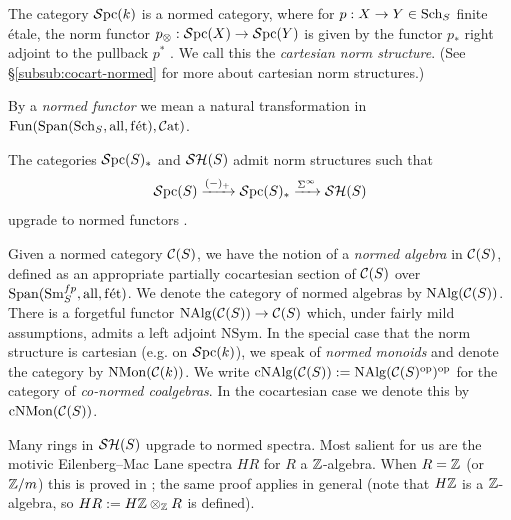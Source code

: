 \documentclass{amsart}
\numberwithin{proposition}{section}
\numberwithin{equation}{section}
\def\fet{\mathrm{f\acute et}}
\def\all{\mathrm{all}}
\def\NSym{\mathrm{NSym}}
\def\NMon{\mathrm{NMon}}
\def\cNMon{\mathrm{cNMon}}
\def\cNAlg{\mathrm{cNAlg}}
\begin{document}
\begin{example}
The category $\mathcal{S}\mathrm{pc}{}(k)$ is a normed category, where for $p: X \to Y \in \mathrm{S}\mathrm{ch}{}_S$ finite étale, the norm functor $p_\otimes: \mathcal{S}\mathrm{pc}{}(X) \to \mathcal{S}\mathrm{pc}{}(Y)$ is given by the functor $p_*$ right adjoint to the pullback $p^*$ \cite[Proposition~2.11 and \S6.1]{bachmann-norms}.
We call this the \emph{cartesian norm structure}.
(See \S\ref{subsub:cocart-normed} for more about cartesian norm structures.)
\end{example}

By a \emph{normed functor} we mean a natural transformation in $\Fun(\Span(\Sch_S, \all,\fet), \Cat)$.
\begin{example}
The categories $\mathcal{S}\mathrm{pc}{}(S)_*$ and $\mathcal{SH}(S)$ admit norm structures such that \[ \mathcal{S}\mathrm{pc}{}(S) \xrightarrow{(\mathord-)_+} \mathcal{S}\mathrm{pc}{}(S)_* \xrightarrow{\Sigma^\infty} \mathcal{SH}(S) \] upgrade to normed functors \cite[\S6.1]{bachmann-norms}.
\end{example}

Given a normed category $\mathcal C(S)$, we have the notion of a \emph{normed algebra} in $\mathcal C(S)$, defined as an appropriate partially cocartesian section of $\mathcal C(S)$ over $\Span(\Sm_S^{fp}, \all, \fet)$.
We denote the category of normed algebras by $\mathrm{NAlg}(\mathcal C(S))$.
There is a forgetful functor $\mathrm{NAlg}(\mathcal C(S)) \to \mathcal C(S)$ which, under fairly mild assumptions, admits a left adjoint $\NSym$.
In the special case that the norm structure is cartesian (e.g. on $\mathcal{S}\mathrm{pc}{}(k)$), we speak of \emph{normed monoids} and denote the category by $\NMon(\scr C(k))$.
We write $\cNAlg(\scr C(S)) := \NAlg(\scr C(S)^\op)^\op$ for the category of \emph{co-normed coalgebras}.
In the cocartesian case we denote this by $\cNMon(\scr C(S))$.

\begin{example} \label{ex:HR-normed}
Many rings in $\mathcal{SH}(S)$ upgrade to normed spectra.
Most salient for us are the motivic Eilenberg--Mac Lane spectra $HR$ for $R$ a $\mathbb{Z}$-algebra.
When $R=\mathbb{Z}$ (or $\mathbb{Z}/m$) this is proved in \cite[Theorem 13.9]{bachmann-norms}; the same proof applies in general (note that $H\mathbb{Z}$ is a $\mathbb{Z}$-algebra, so $HR := H\mathbb{Z} \otimes_{\mathbb{Z}} R$ is defined).
\end{example}
\end{document}
